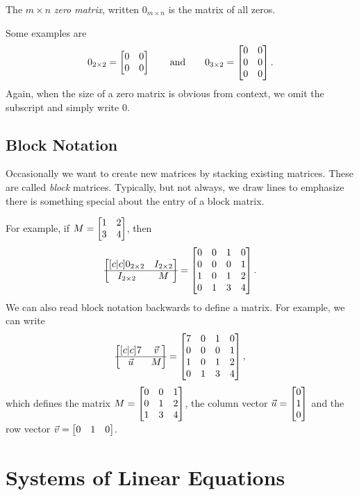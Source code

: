 	\begin{definition}
		The $m\times n$ \emph{zero matrix},
		written $0_{m\times n}$ is the matrix of all zeros.
	\end{definition}
	Some examples are
	\[
		0_{2\times 2}=\mat{0&0\\0&0}\qquad\text{and}\qquad
		0_{3\times 2}=\mat{0&0\\0&0\\0&0}.
	\]
	Again, when the size of a zero matrix is obvious from context, we omit the subscript
	and simply write $0$.

\subsection{Block Notation}
	Occasionally we want to create new matrices by stacking existing matrices.
	These are called \emph{block} matrices. Typically, but not always, we draw lines
	to emphasize there is something special about the entry of a block matrix.

	For example, if $M=\mat{1&2\\3&4}$, then
	\[
		\begin{bmatrix}[c|c]
			0_{2\times 2} & I_{2\times 2}\\
			\hline
			I_{2\times 2} & M\\
		\end{bmatrix}
		=\mat{0&0&1&0\\0&0&0&1\\
		1&0&1&2\\
		0&1&3&4}.
	\]
	We can also read block notation backwards to define a matrix. For example,
	we can write
	\[
		\begin{bmatrix}[c|c]
			7 & \vec v\\
			\hline
			\vec u & M\\
		\end{bmatrix}
		=\mat{7&0&1&0\\0&0&0&1\\
		1&0&1&2\\
		0&1&3&4},
	\]
	which defines the matrix $M=\mat{0&0&1\\0&1&2\\1&3&4}$, the column 
	vector $\vec u=\mat{0\\1\\0}$
	and the row vector $\vec v=\mat{0&1&0}$.

\section{Systems of Linear Equations}

